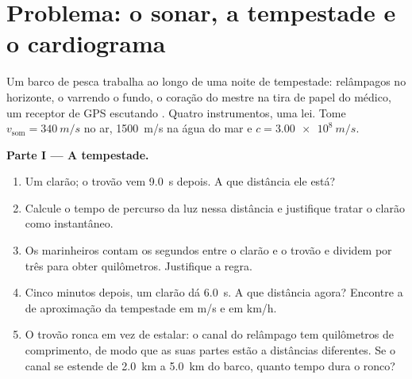 \section{Problema: o sonar, a tempestade e o cardiograma}

\begin{problem}[{Problema de fim de semana --- ler os sinais do mundo:
uma única lei, $d = v\,t$, mede a distância de uma tempestade, mapeia um
fundo de mar, conta um batimento cardíaco e revela como funciona o GPS}]
\label{pb:g10:signals-and-waves:1}
Um barco de pesca trabalha ao longo de uma noite de tempestade:
relâmpagos no horizonte, o  varrendo o fundo, o coração do mestre na
tira de papel do médico, um receptor de GPS escutando . Quatro
instrumentos, uma lei. Tome $v_{\text{som}} = \qty{340}{m/s}$ no ar,
\qty{1500}{m/s} na água do mar e $c = \qty{3.00e8}{m/s}$.

\medskip
\noindent\textbf{Parte I --- A tempestade.}
\begin{enumerate}
  \item Um clarão; o trovão vem \qty{9.0}{s} depois. A que distância ele
        está?
  \item Calcule o tempo de percurso da luz nessa distância e justifique
        tratar o clarão como instantâneo.
  \item Os marinheiros contam os segundos entre o clarão e o trovão e
        dividem por três para obter quilômetros. Justifique a regra.
  \item Cinco minutos depois, um clarão dá \qty{6.0}{s}. A que distância
        agora? Encontre a  de aproximação da tempestade
        em \unit{m/s} e em \unit{km/h}.
  \item O trovão ronca em vez de estalar: o canal do relâmpago tem
        quilômetros de comprimento, de modo que as suas partes estão a
        distâncias diferentes. Se o canal se estende de \qty{2.0}{km} a
        \qty{5.0}{km} do barco, quanto tempo dura o ronco?
\end{enumerate}


\end{problem}
